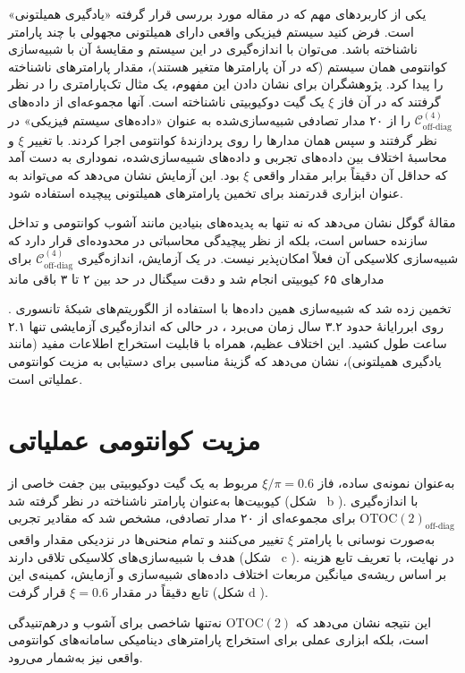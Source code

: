 یکی از کاربردهای مهم  که در مقاله مورد بررسی قرار گرفته «یادگیری همیلتونی» است. فرض کنید سیستم فیزیکی واقعی دارای همیلتونی مجهولی با چند پارامتر ناشناخته باشد. می‌توان با اندازه‌گیری  در این سیستم و مقایسهٔ آن با شبیه‌سازی کوانتومی همان سیستم (که در آن پارامترها متغیر هستند)، مقدار پارامترهای ناشناخته را پیدا کرد. پژوهشگران برای نشان دادن این مفهوم، یک مثال تک‌پارامتری را در نظر گرفتند که در آن فاز \(\xi\) یک گیت دوکیوبیتی ناشناخته است. آنها مجموعه‌ای از داده‌های \(\mathcal{C}_{\text{off-diag}}^{(4)}\) را از ۲۰ مدار تصادفی شبیه‌سازی‌شده به عنوان «داده‌های سیستم فیزیکی» در نظر گرفتند و سپس همان مدارها را روی پردازندهٔ کوانتومی اجرا کردند. با تغییر \(\xi\) و محاسبهٔ اختلاف بین داده‌های تجربی و داده‌های شبیه‌سازی‌شده، نموداری به دست آمد که حداقل آن دقیقاً برابر مقدار واقعی \(\xi\) بود. این آزمایش نشان می‌دهد که  می‌تواند به عنوان ابزاری قدرتمند برای تخمین پارامترهای همیلتونی پیچیده استفاده شود.


مقالهٔ گوگل نشان می‌دهد که  نه تنها به پدیده‌های بنیادین مانند آشوب کوانتومی و تداخل سازنده حساس است، بلکه از نظر پیچیدگی محاسباتی در محدوده‌ای قرار دارد که شبیه‌سازی کلاسیکی آن فعلاً امکان‌پذیر نیست. در یک آزمایش، اندازه‌گیری \(\mathcal{C}_{\text{off-diag}}^{(4)}\) برای مدارهای ۶۵ کیوبیتی انجام شد و دقت سیگنال در حد  بین ۲ تا ۳ باقی ماند

. تخمین زده شد که شبیه‌سازی همین داده‌ها با استفاده از الگوریتم‌های شبکهٔ تانسوری روی ابررایانهٔ  حدود ۳.۲ سال زمان می‌برد
، در حالی که اندازه‌گیری آزمایشی تنها ۲.۱ ساعت طول کشید. این اختلاف عظیم، همراه با قابلیت استخراج اطلاعات مفید (مانند یادگیری همیلتونی)، نشان می‌دهد که  گزینهٔ مناسبی برای دستیابی به مزیت کوانتومی عملیاتی است. 
\section{مزیت کوانتومی عملیاتی}
به‌عنوان نمونه‌ی ساده، فاز \(\xi/\pi = 0.6\) مربوط به یک گیت دوکیوبیتی بین جفت خاصی از کیوبیت‌ها به‌عنوان پارامتر ناشناخته در نظر گرفته شد (شکل~ b \lr{\ref{fig5}}).  
با اندازه‌گیری \(\mathrm{OTOC(2)}_{\text{off-diag}}\) برای مجموعه‌ای از ۲۰ مدار تصادفی، مشخص شد که مقادیر تجربی به‌صورت نوسانی با پارامتر \(\xi\) تغییر می‌کنند و تمام منحنی‌ها در نزدیکی مقدار واقعی هدف با شبیه‌سازی‌های کلاسیکی تلاقی دارند (شکل~ c \lr{\ref{fig5}}).  
در نهایت، با تعریف تابع هزینه بر اساس ریشه‌ی میانگین مربعات اختلاف داده‌های شبیه‌سازی و آزمایش، کمینه‌ی این تابع دقیقاً در مقدار \(\xi = 0.6\) قرار گرفت (شکل d \lr{\ref{fig5}}).  

این نتیجه نشان می‌دهد که \(\mathrm{OTOC(2)}\) نه‌تنها شاخصی برای آشوب و درهم‌تنیدگی است، بلکه ابزاری عملی برای استخراج پارامترهای دینامیکی سامانه‌های کوانتومی واقعی نیز به‌شمار می‌رود.

